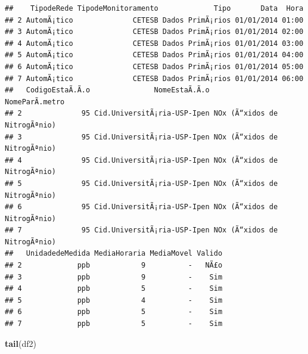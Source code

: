 \documentclass[]{book}
\newenvironment{Shaded}{\begin{snugshade}}{\end{snugshade}}
\newcommand{\KeywordTok}[1]{\textcolor[rgb]{0.13,0.29,0.53}{\textbf{#1}}}
\newcommand{\NormalTok}[1]{#1}
\theoremstyle{definition}
\theoremstyle{definition}
\theoremstyle{definition}
\theoremstyle{remark}
\begin{document}
\begin{verbatim}
##    TipodeRede TipodeMonitoramento             Tipo       Data  Hora
## 2 AutomÃ¡tico              CETESB Dados PrimÃ¡rios 01/01/2014 01:00
## 3 AutomÃ¡tico              CETESB Dados PrimÃ¡rios 01/01/2014 02:00
## 4 AutomÃ¡tico              CETESB Dados PrimÃ¡rios 01/01/2014 03:00
## 5 AutomÃ¡tico              CETESB Dados PrimÃ¡rios 01/01/2014 04:00
## 6 AutomÃ¡tico              CETESB Dados PrimÃ¡rios 01/01/2014 05:00
## 7 AutomÃ¡tico              CETESB Dados PrimÃ¡rios 01/01/2014 06:00
##   CodigoEstaÃ.Ã.o               NomeEstaÃ.Ã.o               NomeParÃ.metro
## 2              95 Cid.UniversitÃ¡ria-USP-Ipen NOx (Ã“xidos de NitrogÃªnio)
## 3              95 Cid.UniversitÃ¡ria-USP-Ipen NOx (Ã“xidos de NitrogÃªnio)
## 4              95 Cid.UniversitÃ¡ria-USP-Ipen NOx (Ã“xidos de NitrogÃªnio)
## 5              95 Cid.UniversitÃ¡ria-USP-Ipen NOx (Ã“xidos de NitrogÃªnio)
## 6              95 Cid.UniversitÃ¡ria-USP-Ipen NOx (Ã“xidos de NitrogÃªnio)
## 7              95 Cid.UniversitÃ¡ria-USP-Ipen NOx (Ã“xidos de NitrogÃªnio)
##   UnidadedeMedida MediaHoraria MediaMovel Valido
## 2             ppb            9          -   NÃ£o
## 3             ppb            9          -    Sim
## 4             ppb            5          -    Sim
## 5             ppb            4          -    Sim
## 6             ppb            5          -    Sim
## 7             ppb            5          -    Sim
\end{verbatim}

\begin{Shaded}
\begin{Highlighting}[]
\KeywordTok{tail}\NormalTok{(df2)}
\end{Highlighting}
\end{Shaded}
\end{document}
